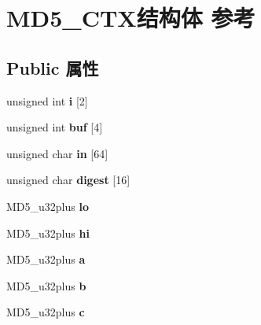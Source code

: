 \hypertarget{struct_m_d5___c_t_x}{}\section{M\+D5\+\_\+\+C\+T\+X结构体 参考}
\label{struct_m_d5___c_t_x}
\subsection*{Public 属性}
\begin{DoxyCompactItemize}
\item 
\mbox{\label{struct_m_d5___c_t_x_ad963fabcd21d7c9b0fca52ebc31d2581}} 
unsigned int {\bfseries i} \mbox{[}2\mbox{]}
\item 
\mbox{\label{struct_m_d5___c_t_x_abf4a3b66e3f2e5cf25da4eb1e62f99c0}} 
unsigned int {\bfseries buf} \mbox{[}4\mbox{]}
\item 
\mbox{\label{struct_m_d5___c_t_x_a22279fa3572a25b4c26b47fabdd62c2f}} 
unsigned char {\bfseries in} \mbox{[}64\mbox{]}
\item 
\mbox{\label{struct_m_d5___c_t_x_a2db96a860b08c06c3a827c40ca2777a8}} 
unsigned char {\bfseries digest} \mbox{[}16\mbox{]}
\item 
\mbox{\label{struct_m_d5___c_t_x_a90437ec62a8dda787f1667061d9755fe}} 
M\+D5\+\_\+u32plus {\bfseries lo}
\item 
\mbox{\label{struct_m_d5___c_t_x_a3234f683810977ac629c2a8a05a1cc87}} 
M\+D5\+\_\+u32plus {\bfseries hi}
\item 
\mbox{\label{struct_m_d5___c_t_x_abfbd731eb0b9d13a75ee4e49715e30b5}} 
M\+D5\+\_\+u32plus {\bfseries a}
\item 
\mbox{\label{struct_m_d5___c_t_x_a63ef5819a909e0b4065796dfdac25962}} 
M\+D5\+\_\+u32plus {\bfseries b}
\item 
\mbox{\label{struct_m_d5___c_t_x_a6226440d9b52200d32153df206fe3761}} 
M\+D5\+\_\+u32plus {\bfseries c}
\item 

\end{DoxyCompactItemize}
